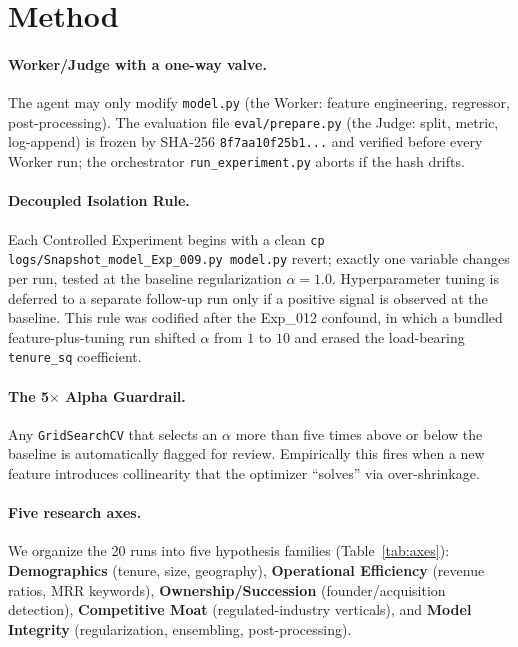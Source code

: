 \documentclass{article}
\begin{document}
\section{Method}
\label{sec:method}

\paragraph{Worker/Judge with a one-way valve.}
The agent may only modify \texttt{model.py} (the Worker: feature engineering, regressor,
post-processing). The evaluation file \texttt{eval/prepare.py} (the Judge: split, metric,
log-append) is frozen by SHA-256 \texttt{8f7aa10f25b1...} and verified before every Worker
run; the orchestrator \texttt{run\_experiment.py} aborts if the hash drifts.

\paragraph{Decoupled Isolation Rule.}
Each Controlled Experiment begins with a clean
\texttt{cp logs/Snapshot\_model\_Exp\_009.py model.py} revert; exactly one variable changes
per run, tested at the baseline regularization $\alpha{=}1.0$. Hyperparameter tuning is
deferred to a separate follow-up run only if a positive signal is observed at the
baseline. This rule was codified after the Exp\_012 confound, in which a bundled
feature-plus-tuning run shifted $\alpha$ from $1$ to $10$ and erased the load-bearing
\texttt{tenure\_sq} coefficient.

\paragraph{The 5$\times$ Alpha Guardrail.}
Any \texttt{GridSearchCV} that selects an $\alpha$ more than five times above or below the
baseline is automatically flagged for review. Empirically this fires when a new feature
introduces collinearity that the optimizer ``solves'' via over-shrinkage.

\paragraph{Five research axes.}
We organize the 20 runs into five hypothesis families (Table~\ref{tab:axes}):
\textbf{Demographics} (tenure, size, geography), \textbf{Operational Efficiency} (revenue
ratios, MRR keywords), \textbf{Ownership/Succession} (founder/acquisition detection),
\textbf{Competitive Moat} (regulated-industry verticals), and \textbf{Model Integrity}
(regularization, ensembling, post-processing).
\end{document}
